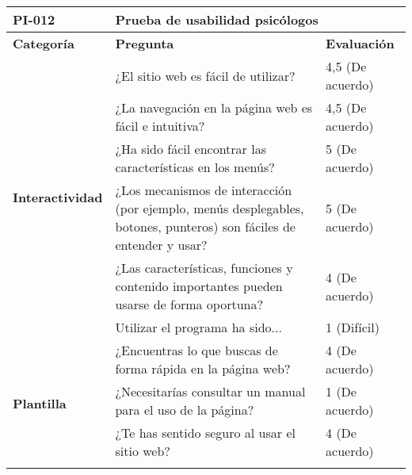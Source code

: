 \begin{table}[htpb]
\centering
\begin{tabularx}{\textwidth}{|l|X|l|}
\hline
\textbf{PI-012}                           & \multicolumn{2}{l|}{\textbf{Prueba de usabilidad psicólogos}}                                                                             \\ \hline
\textbf{Categoría}                        & \textbf{Pregunta}                                                                                                   & \textbf{Evaluación} \\ \hline
\multirow{6}{*}{\textbf{Interactividad}}  & ¿El sitio web es fácil de utilizar?                                                                                 & 4,5 (De acuerdo)    \\ \cline{2-3} 
                                          & ¿La navegación en la página web es fácil e intuitiva?                                                               & 4,5 (De acuerdo)    \\ \cline{2-3} 
                                          & ¿Ha sido fácil encontrar las características en los menús?                                                          & 5 (De acuerdo)      \\ \cline{2-3} 
                                          & ¿Los mecanismos de interacción (por ejemplo, menús desplegables, botones, punteros) son fáciles de entender y usar? & 5 (De acuerdo)      \\ \cline{2-3} 
                                          & ¿Las características, funciones y contenido importantes pueden usarse de forma oportuna?                            & 4 (De acuerdo)      \\ \cline{2-3} 
                                          & Utilizar el programa ha sido...                                                                                     & 1 (Difícil)         \\ \hline
\multirow{4}{*}{\textbf{Plantilla}}       & ¿Encuentras lo que buscas de forma rápida en la página web?                                                         & 4 (De acuerdo)      \\ \cline{2-3} 
                                          & ¿Necesitarías consultar un manual para el uso de la página?                                                         & 1 (De acuerdo)      \\ \cline{2-3} 
                                          & ¿Te has sentido seguro al usar el sitio web?                                                                        & 4 (De acuerdo)      \\ \cline{2-3} 

\end{tabularx}
\end{table}
